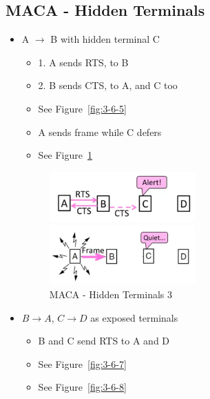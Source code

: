 \documentclass[12pt]{ctexart}   %
\begin{document}
	\subsection{MACA - Hidden Terminals}
	\begin{itemize}
		\item A $\rightarrow$ B with hidden terminal C
		\begin{itemize}
			\item {\color{blue} 1.} A sends RTS, to B
			\item {\color{blue} 2.} B sends CTS, to A, and C too 
			\item See Figure~\ref{fig:3-6-5}
			\item A sends frame while C defers
			\item See Figure~\ref{fig:3-6-6}
		\end{itemize}
		
		\begin{figure}
			\begin{minipage}[t]{0.5\linewidth}
				\centering
				\includegraphics[width=2.2in]{images/3-6-5}
				\caption{MACA - Hidden Terminals 1 and 2}
				\label{fig:3-6-5}
			\end{minipage}
			\begin{minipage}[t]{0.5\linewidth}
				\centering
				\includegraphics[width=2.2in]{images/3-6-6}
				\caption{MACA - Hidden Terminals 3}
				\label{fig:3-6-6}
			\end{minipage}
		\end{figure}
		
		\item $B \rightarrow A$, $C \rightarrow D$ as exposed terminals
		\begin{itemize}
			\item B and C send RTS to A and D
			\item See Figure~\ref{fig:3-6-7}
			\item See Figure~\ref{fig:3-6-8}
		\end{itemize}
		

\end{itemize}
\end{document}

